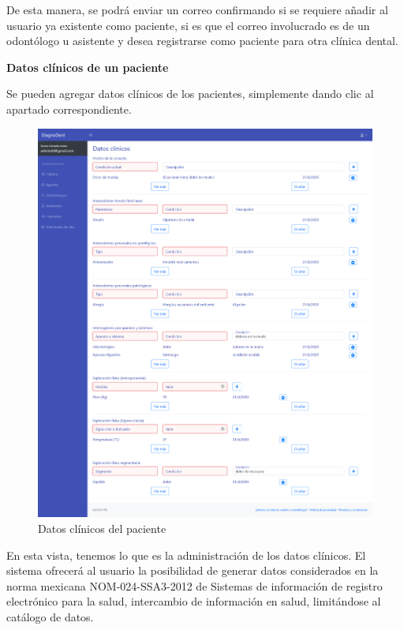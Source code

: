 De esta manera, se podrá enviar un correo confirmando si se requiere añadir al usuario ya existente como paciente, si es que el correo involucrado es de un odontólogo u asistente y desea registrarse como paciente para otra clínica dental.

\vspace{1em}

{\large \textbf{Datos clínicos de un paciente}}

\vspace{1em}

Se pueden agregar datos clínicos de los pacientes, simplemente dando clic al apartado correspondiente.

\begin{figure}[H]
\centering
\includegraphics[width=17cm,keepaspectratio]{pictures/adminodo/pacientes/datos/datos-clinicos.png}
\caption{Datos clínicos del paciente}
\end{figure}

En esta vista, tenemos lo que es la administración de los datos clínicos. El sistema ofrecerá al usuario la posibilidad de generar datos considerados en la norma mexicana NOM-024-SSA3-2012 de Sistemas de información de registro electrónico para la salud, intercambio de información en salud, limitándose al catálogo de datos.

